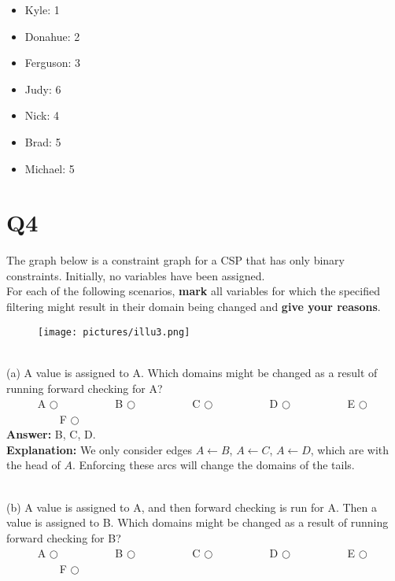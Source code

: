 \documentclass{article}
\begin{document}
\begin{itemize}
    \item Kyle: 1
    
    \item Donahue: 2
    
    \item Ferguson: 3
    
    \item Judy: 6

    \item Nick: 4

    \item Brad: 5

    \item Michael: 5
\end{itemize}


\newpage

\section{Q4}
\noindent The graph below is a constraint graph for a CSP that has only binary constraints. Initially, no variables have been assigned.\\


\noindent For each of the following scenarios, \textbf{mark} all variables for which the specified filtering might result in their domain being changed and \textbf{give your reasons}.

\begin{figure}[h]
\centering
\texttt{[image: pictures/illu3.png]}
\end{figure}
~\\

\noindent (a) A value is assigned to A. Which domains might be changed as a result of running forward checking for A? \\
\indent ~~~~~ A $\bigcirc$ ~~~~~~~~~  B $\bigcirc$ ~~~~~~~~~  C $\bigcirc$ ~~~~~~~~~  D $\bigcirc$ ~~~~~~~~~  E $\bigcirc$~~~~~~~~~  F $\bigcirc$ \\

\textbf{Answer:} B, C, D. \\

\textbf{Explanation:} We only consider edges $A \leftarrow B$, $A \leftarrow C$, $A \leftarrow D$, which are with the head of $A$. Enforcing these arcs will change the domains of the tails.

~\\

\noindent (b) A value is assigned to A, and then forward checking is run for A. Then a value is assigned to B. Which domains might be changed as a result of running forward checking for B? \\
\indent ~~~~~ A $\bigcirc$ ~~~~~~~~~  B $\bigcirc$ ~~~~~~~~~  C $\bigcirc$ ~~~~~~~~~  D $\bigcirc$ ~~~~~~~~~  E $\bigcirc$~~~~~~~~~  F $\bigcirc$ \\
\end{document}
